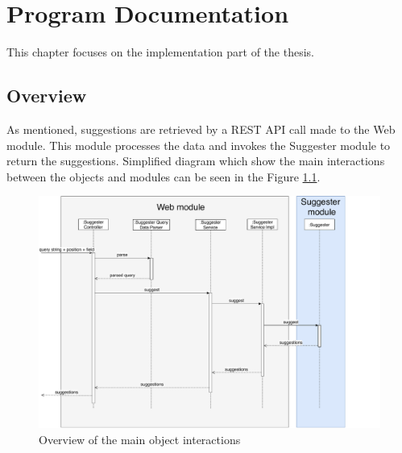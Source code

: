 \chapter{Program Documentation}
\label{chap:program}

This chapter focuses on the implementation part of the thesis.

\section{Overview}
As mentioned, suggestions are retrieved by a REST API call made to the Web module. This module processes the data and
invokes the Suggester module to return the suggestions. Simplified diagram which show the main interactions between the
objects and modules can be seen in the Figure \ref{programmer_sequence}.
\begin{figure}[htbp]
    \centering
    \includegraphics[width=145mm]{../img/programmer_sequence.pdf}
    \caption{Overview of the main object interactions}
    \label{programmer_sequence}
\end{figure}

